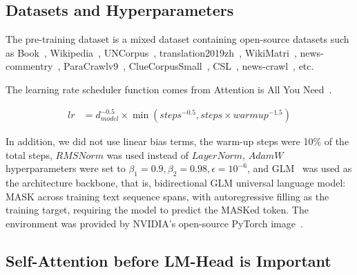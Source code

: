 \documentclass{article}
\theoremstyle{plain}
\theoremstyle{definition}
\theoremstyle{remark}
\begin{document}
\subsection{Datasets and Hyperparameters}
The pre-training dataset is a mixed dataset containing open-source datasets such as Book~\cite{bookcrossing_dataset}, Wikipedia~\cite{wikipedia_dataset}, UNCorpus~\cite{uncorpus_dataset}, translation2019zh~\cite{translation2019zh_dataset}, WikiMatri~\cite{WikiMatri}, news-commentry~\cite{newscommentary_dataset}, ParaCrawlv9~\cite{paracrawl_dataset}, ClueCorpusSmall~\cite{cluecorpusSmall_dataset}, CSL~\cite{li-etal-2022-csl}, news-crawl~\cite{newscrawl_dataset}, etc.

The learning rate scheduler function comes from Attention is All You Need~\cite{wolf-etal-2020-transformers}.

\begin{equation}
\begin{aligned}
   lr &= d_{model}^{-0.5} \times \min(steps^{-0.5}, steps \times warmup^{-1.5})
\end{aligned}
\end{equation}

In addition, we did not use linear bias terms, the warm-up steps were 10\% of the total steps, $RMSNorm$ was used instead of $LayerNorm$, $AdamW$ hyperparameters were set to $\beta_1 = 0.9, \beta_2 = 0.98, \epsilon = 10^{-6}$, and GLM~\cite{du2022glm} was used as the architecture backbone, that is, bidirectional GLM universal language model: MASK across training text sequence spans, with autoregressive filling as the training target, requiring the model to predict the MASKed token. The environment was provided by NVIDIA's open-source PyTorch image~\cite{pytorch}.


\subsection{Self-Attention before LM-Head is Important}
\label{sec:Self-Attention_before_LM-Head_is_Important}
\end{document}
